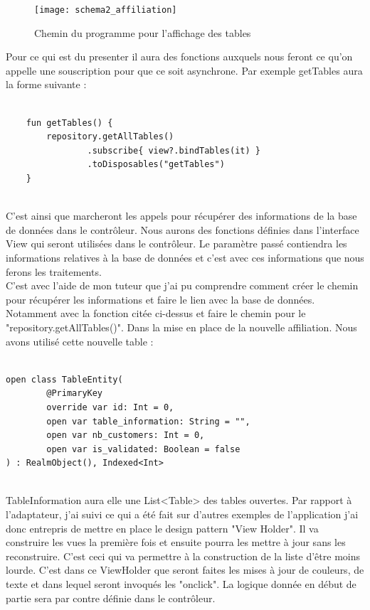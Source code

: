 \begin{figure}[!htp]
  \centering
  \texttt{[image: schema2\_affiliation]}
  \caption{Chemin du programme pour l'affichage des tables}
  \label{fig:boat1}
\end{figure}

Pour ce qui est du presenter il aura des fonctions auxquels nous feront ce qu'on appelle une souscription pour que ce soit asynchrone. Par exemple getTables aura la forme suivante :

\begin{lstlisting}[frame=single]  % Start your code-block
    
    fun getTables() {
        repository.getAllTables()
                .subscribe{ view?.bindTables(it) }
                .toDisposables("getTables")
    }
    
\end{lstlisting}

C'est ainsi que marcheront les appels pour récupérer des informations de la base de données dans le contrôleur. Nous aurons des fonctions définies dans l'interface View qui seront utilisées dans le contrôleur. Le paramètre passé contiendra les informations relatives à la base de données et c'est avec ces informations que nous ferons les traitements.\\

C'est avec l'aide de mon tuteur que j'ai pu comprendre comment créer le chemin pour récupérer les informations et faire le lien avec la base de données. Notamment avec la fonction citée ci-dessus et faire le chemin pour le "repository.getAllTables()". Dans la mise en place de la nouvelle affiliation. Nous avons utilisé cette nouvelle table :

\begin{lstlisting}[frame=single]  % Start your code-block
    
open class TableEntity(
        @PrimaryKey
        override var id: Int = 0,
        open var table_information: String = "",
        open var nb_customers: Int = 0,
        open var is_validated: Boolean = false
) : RealmObject(), Indexed<Int>
    
\end{lstlisting}

TableInformation aura elle une List<Table> des tables ouvertes. Par rapport à l'adaptateur, j'ai suivi ce qui a été fait sur d'autres exemples de l'application j'ai donc entrepris de mettre en place le design pattern "View Holder". Il va construire les vues la première fois et ensuite pourra les mettre à jour sans les reconstruire. C'est ceci qui va permettre à la construction de la liste d'être moins lourde. C'est dans ce ViewHolder que seront faites les mises à jour de couleurs, de texte et dans lequel seront invoqués les "onclick". La logique donnée en début de partie sera par contre définie dans le contrôleur. 

